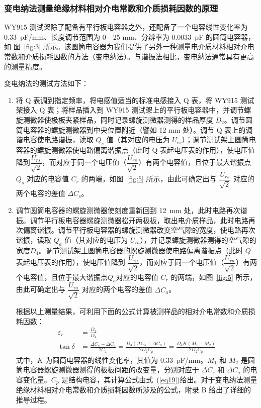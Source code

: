 \documentclass[a4paper,utf8]{article}
\newcommand{\fgref}[1]{图~\ref{#1} }
\newcommand{\seqref}[1]{式~(\ref{#1})}
\begin{document}
        \subsubsection{变电纳法测量绝缘材料相对介电常数和介质损耗因数的原理}
            WY915 测试架除了配备有平行板电容器之外，还配备了一个电容线性变化率为 \SI{0.33}{\pico\farad/\milli\metre}、长度调节范围为 0—25 \unit{\milli\metre}、分辨率为 \SI{0.0033}{\pico\farad} 的圆筒电容器，如 \fgref{fig:3} 所示。该圆筒电容器为我们提供了另外一种测量电介质材料相对介电常数和介质损耗因数的方法（变电纳法）。与谐振法相比，变电纳法通常具有更高的测量精度。\par
            变电纳法的测试方法如下：
            \begin{enumerate}
                \item 将 Q 表调到指定频率，将电感值适当的标准电感接入 Q 表，将 WY915 测试架接入 Q 表；将样品插入到 WY915 测试架上的平行板电容器中，并调节螺旋测微器使极板夹紧样品，同时记录螺旋测微器测得的样品厚度 $D_2$。调节圆筒电容器的螺旋测微器到中央位置附近（譬如 12 \unit{\milli\metre} 处）。调节 Q 表上的调谐电容使电路谐振，读取 $Q_s$ 值（其对应的电压为 $U_{rs}$）；调节测试架上圆筒电容器的螺旋测微器使电路偏离谐振点（此时 Q 表起电压表的作用），使电压值降到$\dfrac{U_{rs}}{\sqrt{2}}$，而对应于同一个电压值（$\dfrac{U_{rs}}{\sqrt{2}}$）有两个电容值，且位于最大谐振点 $Q_s$ 对应的电容值 $C_r$ 的两端，如\fgref{fig:5}所示，由此可确定出与 $\dfrac{U_{rs}}{\sqrt{2}}$ 对应的两个电容的差值 $\varDelta  C_s$。
                \item 调节圆筒电容器的螺旋测微器使刻度重新回到 \SI{12}{\milli\metre} 处，此时电路再次谐振。调节平行板电容器螺旋测微器松开两极板，取出电介质样品，此时电路再次偏离谐振。调节平行板电容器的螺旋测微器改变空气隙的宽度，使电路再次谐振，读取 $Q_a$ 值（其对应的电压为 $U_{ra}$），并记录螺旋测微器测得的空气隙的宽度$D_4$。调节测试架上圆筒电容器的螺旋测微器使电路偏离谐振点（此时 $Q$ 表起电压表的作用），使电压值降到 $\dfrac{U_{ra}}{\sqrt{2}}$，而对应于同一个电压值（$\dfrac{U_{ra}}{\sqrt{2}}$）有两个电容值，且位于最大谐振点$ Q_a $对应的电容值 $C_r$ 的两端，如\fgref{fig:5}所示，由此可确定出与 $\dfrac{U_{ra}}{\sqrt{2}}$ 对应的两个电容的差值 $\varDelta C_a$。\par
                根据以上测量结果，可利用下面的公式计算被测样品的相对介电常数和介质损耗因数：
                \begin{align}
                    \varepsilon_r&=\frac{D_2}{D_4}\label{eq23}\\
                    \tan\delta&=\frac{\Delta C_{s}-\Delta C_{a}}{2C_{x}}=\frac{D_{4}(\Delta C_{s}-\Delta C_{a})}{2D_{2}C_{p}}=\frac{D_{4}K(M_{1}-M_{2})}{2D_{2}C_{p}}\label{eq24}
                \end{align}
                式中，$K$ 为圆筒电容器的线性变化率，其值为 \SI{.33}{\pico\farad/\milli\metre}。$M_1$ 和 $M_2$ 是圆筒电容器螺旋测微器测得的极板间距的改变量，分别对应于 $\varDelta C_s$ 和 $\varDelta C_a$ 的电容变化量。$C_p$ 是结构电容，其计算公式由\seqref{eq19}给出。对于变电纳法测量绝缘材料相对介电常数和介质损耗因数所涉及的公式，附录 B 给出了详细的推导过程。

            \end{enumerate}
\end{document}

